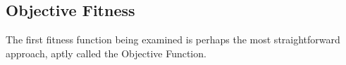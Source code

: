 \subsection{Objective Fitness}


The first fitness function being examined is perhaps the most straightforward approach, aptly called the Objective Function.

